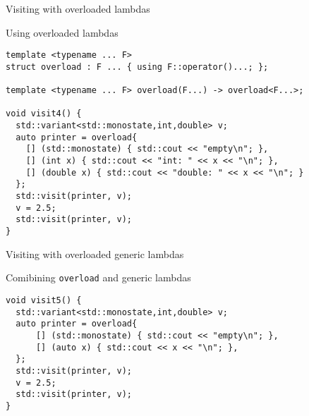 \begin{frame}[t,fragile]{Visiting with overloaded lambdas}
\begin{block}{Using overloaded lambdas}
\begin{lstlisting}
template <typename ... F>
struct overload : F ... { using F::operator()...; };

template <typename ... F> overload(F...) -> overload<F...>;

void visit4() {
  std::variant<std::monostate,int,double> v;
  auto printer = overload{
    [] (std::monostate) { std::cout << "empty\n"; },
    [] (int x) { std::cout << "int: " << x << "\n"; },
    [] (double x) { std::cout << "double: " << x << "\n"; }
  };
  std::visit(printer, v);
  v = 2.5;
  std::visit(printer, v);
}
\end{lstlisting}
\end{block}
\end{frame}

\begin{frame}[t,fragile]{Visiting with overloaded generic lambdas}
\begin{block}{Comibining \texttt{overload} and generic lambdas}
\begin{lstlisting}
void visit5() {
  std::variant<std::monostate,int,double> v;
  auto printer = overload{
      [] (std::monostate) { std::cout << "empty\n"; },
      [] (auto x) { std::cout << x << "\n"; },
  };
  std::visit(printer, v);
  v = 2.5;
  std::visit(printer, v);
}
\end{lstlisting}
\end{block}
\end{frame}

